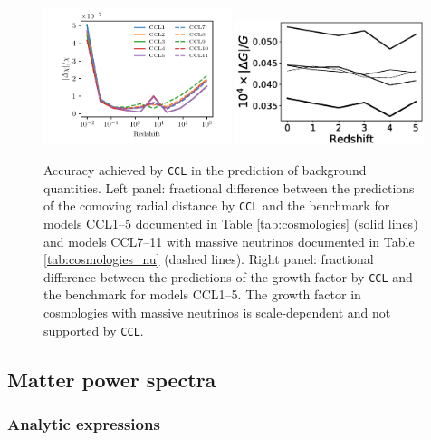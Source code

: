 \documentclass[\docopts]{\docclass}
\newcommand{\ccl}{{\tt CCL}\xspace}
\begin{document}




\begin{figure}
  \centering
  \includegraphics[width=0.49\textwidth]{distances}
  \includegraphics[width=0.49\textwidth]{growth}
  \caption{Accuracy achieved by \ccl in the prediction of background quantities. Left panel: fractional difference between the predictions of the comoving radial distance by \ccl and the benchmark for models CCL1--5 documented in Table \ref{tab:cosmologies} (solid lines) and models CCL7--11 with massive neutrinos documented in Table \ref{tab:cosmologies_nu} (dashed lines). Right panel: fractional difference between the predictions of the growth factor by \ccl and the benchmark for models CCL1--5. The growth factor in cosmologies with massive neutrinos is scale-dependent and not supported by \ccl.}
  \label{fig:distancegrow}
\end{figure}

\subsection{Matter power spectra}

\subsubsection{Analytic expressions}
\label{ss:bbksval}
\end{document}
